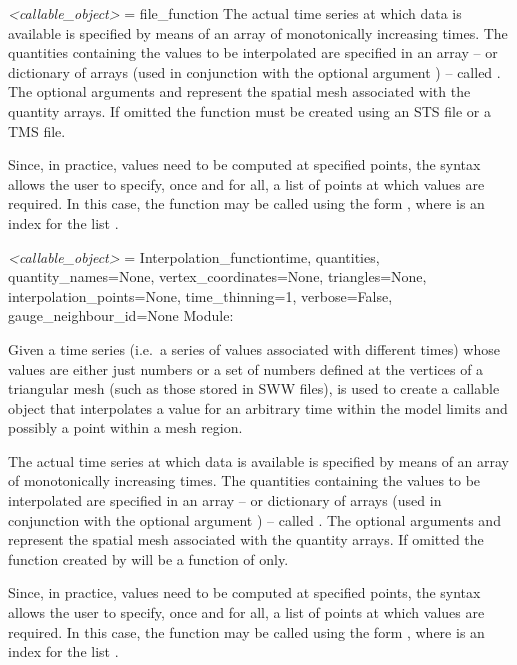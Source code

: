 \documentclass{manual}
\begin{document}
\begin{funcdesc}{\emph{<callable_object>} = file_function}
The actual time series at which data is available is specified by
means of an array  of monotonically increasing times. The
quantities containing the values to be interpolated are specified in
an array -- or dictionary of arrays (used in conjunction with the
optional argument ) -- called
. The optional arguments 
and  represent the spatial mesh associated with the
quantity arrays. If omitted the function must be created using an STS file
or a TMS file.

Since, in practice, values need to be computed at specified points,
the syntax allows the user to specify, once and for all, a list
 of points at which values are required.
In this case, the function may be called using the form ,
where  is an index for the list .
\end{funcdesc}

\begin{classdesc}{\emph{<callable_object>} = Interpolation_function}{time,
                                          quantities,
                                          quantity_names=None,
                                          vertex_coordinates=None,
                                          triangles=None,
                                          interpolation_points=None,
                                          time_thinning=1,
                                          verbose=False,
                                          gauge_neighbour_id=None}
Module: 

Given a time series (i.e.\ a series of values associated with
different times) whose values are either just numbers or a set of
numbers defined at the vertices of a triangular mesh (such as those
stored in SWW files),  is used to
create a callable object that interpolates a value for an arbitrary
time  within the model limits and possibly a point 
within a mesh region.

The actual time series at which data is available is specified by
means of an array  of monotonically increasing times. The
quantities containing the values to be interpolated are specified in
an array -- or dictionary of arrays (used in conjunction with the
optional argument ) -- called
. The optional arguments 
and  represent the spatial mesh associated with the
quantity arrays. If omitted the function created by
 will be a function of  only.

Since, in practice, values need to be computed at specified points,
the syntax allows the user to specify, once and for all, a list
 of points at which values are required.
In this case, the function may be called using the form ,
where  is an index for the list .
\end{classdesc}
\end{document}
